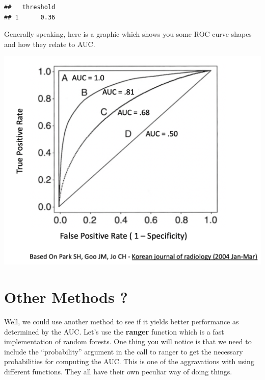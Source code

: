 \documentclass[
]{book}
\newenvironment{Shaded}{\begin{snugshade}}{\end{snugshade}}
\newcommand{\CommentTok}[1]{\textcolor[rgb]{0.56,0.35,0.01}{\textit{#1}}}
\newcommand{\DataTypeTok}[1]{\textcolor[rgb]{0.13,0.29,0.53}{#1}}
\newcommand{\DecValTok}[1]{\textcolor[rgb]{0.00,0.00,0.81}{#1}}
\newcommand{\KeywordTok}[1]{\textcolor[rgb]{0.13,0.29,0.53}{\textbf{#1}}}
\newcommand{\NormalTok}[1]{#1}
\newcommand{\OperatorTok}[1]{\textcolor[rgb]{0.81,0.36,0.00}{\textbf{#1}}}
\newcommand{\OtherTok}[1]{\textcolor[rgb]{0.56,0.35,0.01}{#1}}
\newcommand{\StringTok}[1]{\textcolor[rgb]{0.31,0.60,0.02}{#1}}
\begin{document}
\begin{verbatim}
##   threshold
## 1      0.36
\end{verbatim}

Generally speaking, here is a graphic which shows you some ROC curve shapes and how they relate to AUC.

\includegraphics{./PICS/multirocs.png}

\hypertarget{other-methods}{%
\chapter{Other Methods ?}\label{other-methods}}

Well, we could use another method to see if it yields better performance as determined by the AUC. Let's use the \textbf{ranger} function which is a fast implementation of random forests. One thing you will notice is that we need to include the ``probability'' argument in the call to ranger to get the necessary probabilities for computing the AUC. This is one of the aggravations with using different functions. They all have their own peculiar way of doing things.

\begin{Shaded}
\end{Shaded}
\end{document}

